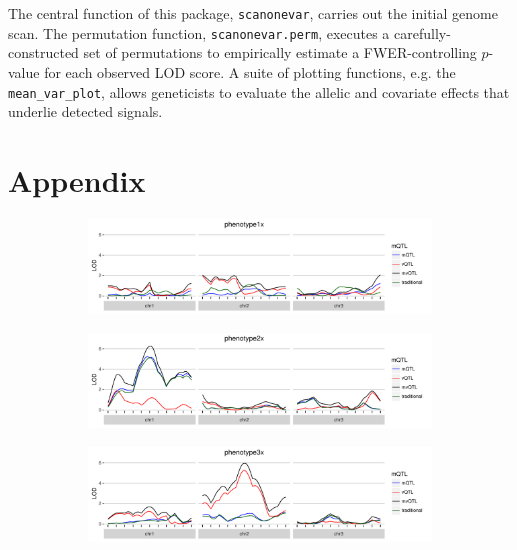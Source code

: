 \documentclass[9pt,twocolumn,twoside]{gsag3jnl}
\begin{document}
The central function of this package, \texttt{scanonevar}, carries out the initial genome scan.
The permutation function, \texttt{scanonevar.perm}, executes a carefully-constructed set of permutations to empirically estimate a FWER-controlling $p$-value for each observed LOD score.
A suite of plotting functions, e.g. the \texttt{mean\_var\_plot}, allows geneticists to evaluate the allelic and covariate effects that underlie detected signals.





\vfill


\newpage
\section*{Appendix}

\begin{figure}[ht!]
    \begin{subfigure}{0.5\textwidth}
        \includegraphics[width=\textwidth]{images/LOD_scan_phenotype1x.pdf}
    \end{subfigure}

    \begin{subfigure}[b]{0.5\textwidth}
        \includegraphics[width=\textwidth]{images/LOD_scan_phenotype2x.pdf}
    \end{subfigure}

    \begin{subfigure}[b]{0.5\textwidth}
        \includegraphics[width=\textwidth]{images/LOD_scan_phenotype3x.pdf}
    \end{subfigure}
    

\end{figure}
\end{document}

